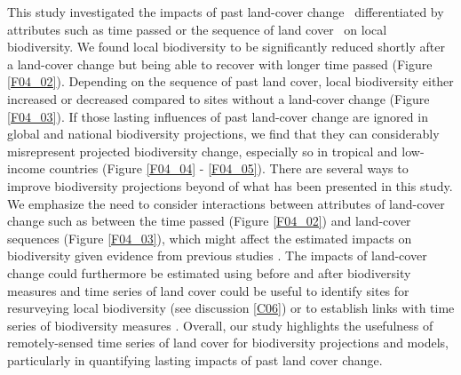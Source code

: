 This study investigated the impacts of past land-cover change \textendash\ differentiated by attributes such as time passed or the sequence of land cover \textendash\ on local biodiversity. We found local biodiversity to be significantly reduced shortly after a land-cover change but being able to recover with longer time passed (Figure \ref{F04_02}). Depending on the sequence of past land cover, local biodiversity either increased or decreased compared to sites without a land-cover change (Figure \ref{F04_03}). If those lasting influences of past land-cover change are ignored in global and national biodiversity projections, we find that they can considerably misrepresent projected biodiversity change, especially so in tropical and low-income countries (Figure \ref{F04_04} - \ref{F04_05}). There are several ways to improve biodiversity projections beyond of what has been presented in this study. We emphasize the need to consider interactions between attributes of land-cover change such as between the time passed (Figure \ref{F04_02}) and land-cover sequences (Figure \ref{F04_03}), which might affect the estimated impacts on biodiversity given evidence from previous studies \citep{Chazdon2003,Martin2013}. The impacts of land-cover change could furthermore be estimated using before and after biodiversity measures \citep{DePalma2018} and time series of land cover could be useful to identify sites for resurveying local biodiversity (see discussion \ref{C06}) or to establish links with time series of biodiversity measures \citep{Dornelas2018}. Overall, our study highlights the usefulness of remotely-sensed time series of land cover for biodiversity projections and models, particularly in quantifying lasting impacts of past land cover change.

\clearpage
%

%  
